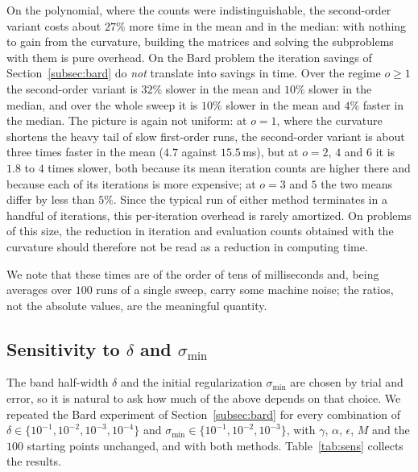 \documentclass[11pt]{article}
\begin{document}
On the polynomial, where the counts were indistinguishable, the
second-order variant costs about $27\%$ more time in the mean and in the
median: with nothing to gain from the curvature, building the matrices and
solving the subproblems with them is pure overhead. On the Bard problem the
iteration savings of Section~\ref{subsec:bard} do \emph{not} translate into
savings in time. Over the regime $o \ge 1$ the second-order variant is $32\%$
slower in the mean and $10\%$ slower in the median, and over the whole sweep it
is $10\%$ slower in the mean and $4\%$ faster in the median. The picture is
again not uniform: at $o = 1$, where the curvature shortens the heavy tail of
slow first-order runs, the second-order variant is about three times faster in
the mean ($4.7$ against $15.5$\,ms), but at $o = 2$, $4$ and $6$ it is $1.8$ to
$4$ times slower, both because its mean iteration counts are higher there and
because each of its iterations is more expensive; at $o = 3$ and $5$ the two
means differ by less than $5\%$. Since the typical run of either method
terminates in a handful of iterations, this per-iteration overhead is rarely
amortized. On problems of this size, the
reduction in iteration and evaluation counts obtained with the curvature should
therefore not be read as a reduction in computing time.

We note that these times are of the order of tens of milliseconds and, being
averages over $100$ runs of a single sweep, carry some machine noise; the
ratios, not the absolute values, are the meaningful quantity.

\subsection{Sensitivity to \texorpdfstring{$\delta$ and $\sigma_{\min}$}{delta and sigma\_min}} \label{subsec:sens}

The band half-width $\delta$ and the initial regularization $\sigma_{\min}$ are
chosen by trial and error, so it is natural to ask how much of the above depends
on that choice. We repeated the Bard experiment of Section~\ref{subsec:bard} for
every combination of $\delta \in \{10^{-1},10^{-2},10^{-3},10^{-4}\}$ and
$\sigma_{\min} \in \{10^{-1},10^{-2},10^{-3}\}$, with $\gamma$, $\alpha$,
$\epsilon$, $M$ and the $100$ starting points unchanged, and with both methods.
Table~\ref{tab:sens} collects the results.
\end{document}
